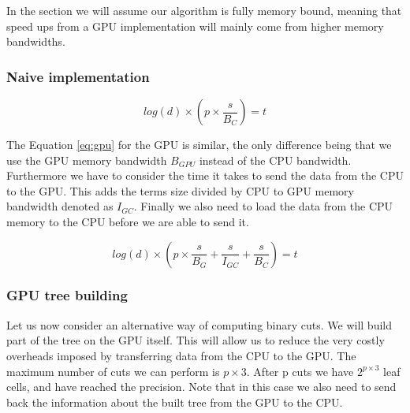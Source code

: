 \documentclass[]{article}
\begin{document}
In the section we will assume our algorithm is fully memory bound, meaning that speed ups from a GPU implementation will mainly come from higher memory bandwidths.

\subsubsection{Naive implementation}

\begin{center}
	\begin{equation}
			log(d) \times \left ( p \times \frac{ s }{B_{C}} \right ) = t
			\label{eq:cpu}
	\end{equation}
\end{center}

\vspace{5mm}


The Equation \ref{eq:gpu} for the GPU is similar, the only difference being that we use the GPU memory bandwidth $B_{GPU}$ instead of the CPU bandwidth. Furthermore we have to consider the time it takes to send the data from the CPU to the GPU. This adds the terms size divided by CPU to GPU memory bandwidth denoted as $I_{GC}$. Finally we also need to load the data from the CPU memory to the CPU before we are able to send it. 

\begin{center}
	\begin{equation}
			log(d) \times \left ( p \times \frac{s}{B_{G}} + \frac{s}{I_{GC}}  + \frac{s}{B_{C}} \right ) = t
		\label{eq:gpu}
	\end{equation}
\end{center}

\vspace{5mm}


\subsubsection{GPU tree building}\label{gpu-tree-building}

Let us now consider an alternative way of computing binary cuts. We will build part of the tree on the GPU itself. This will allow us to reduce the very costly overheads imposed by transferring data from the CPU to the GPU. The maximum number of cuts we can perform is $p \times 3$. After p cuts we have $2^{p \times 3}$ leaf cells, and have reached the precision. Note that in this case we also need to send back the information about the built tree from the GPU to the CPU. 
\end{document}
